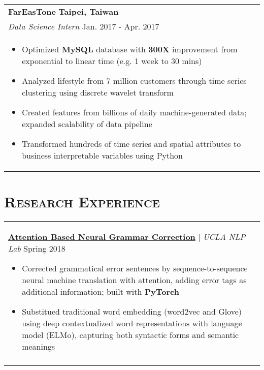 \documentclass[letterpaper,11pt]{article} %
\begin{document}
{\begin{tabular}{p{18.5cm}}
{\bf{FarEasTone}} \hfill \bf{Taipei, Taiwan}\\
{\it Data Science Intern} \hfill  Jan. 2017 - Apr. 2017\\%
\begin{itemize}
\vspace{-3mm}
\item Optimized {\bf MySQL} database with {\bf300X} improvement from exponential to linear time (e.g. 1 week to 30 mins) 
\item Analyzed lifestyle from 7 million customers through time series clustering using discrete wavelet transform
\item Created features from billions of daily machine-generated data; expanded scalability of data pipeline 
\item Transformed hundreds of time series and spatial attributes to business interpretable variables using Python
\vspace*{-\baselineskip}
\end{itemize} 
\vspace{.1mm}
\end{tabular}


\section{\Large\bf\textsc{Research Experience}}
\begin{tabular}{p{18.5cm}}

\href{}{\bf{Attention Based Neural Grammar Correction}} | {\it{UCLA NLP Lab}} \hfill Spring 2018
\begin{itemize}
\item Corrected grammatical error sentences by sequence-to-sequence neural machine translation with attention, adding error tags as additional information; built with {\bf PyTorch}
\item Substitued traditional word embedding (word2vec and Glove) using deep contextualized word representations with language model (ELMo), capturing both syntactic forms and semantic meanings \vspace*{-\baselineskip}
\end{itemize} \\
\vspace{.1mm}


\end{tabular}}
\end{document}
